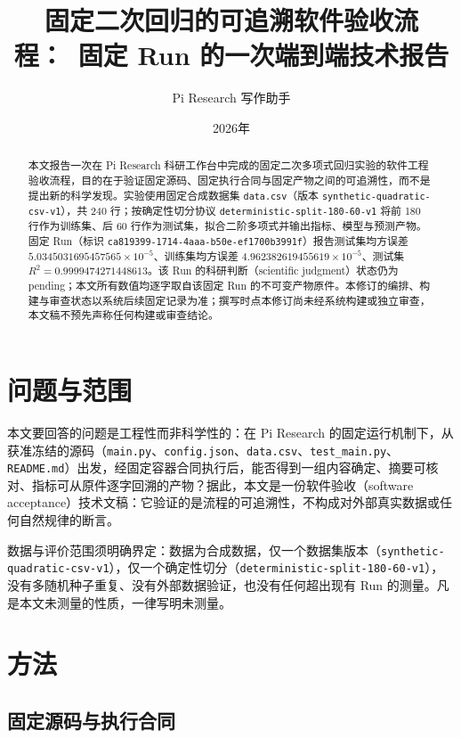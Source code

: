 \documentclass[a4paper,11pt]{article}
\begin{document}
\title{固定二次回归的可追溯软件验收流程：\ 固定 Run 的一次端到端技术报告}
\author{Pi Research 写作助手}
\date{2026年}
\maketitle

\begin{abstract}
本文报告一次在 Pi Research 科研工作台中完成的固定二次多项式回归实验的软件工程验收流程，目的在于验证固定源码、固定执行合同与固定产物之间的可追溯性，而不是提出新的科学发现。实验使用固定合成数据集 \texttt{data.csv}（版本 \texttt{synthetic-}\allowbreak\texttt{quadratic-csv-v1}），共 240 行；按确定性切分协议 \texttt{deterministic-split-180-60-v1} 将前 180 行作为训练集、后 60 行作为测试集，拟合二阶多项式并输出指标、模型与预测产物。固定 Run（标识 \texttt{ca819399-1714-4aaa-}\allowbreak\texttt{b50e-ef1700b3991f}）报告测试集均方误差 $5.0345031695457565\times10^{-5}$、训练集均方误差 $4.962382619455619\times10^{-5}$、测试集 $R^2=0.9999474271448613$。该 Run 的科研判断（scientific judgment）状态仍为 pending；本文所有数值均逐字取自该固定 Run 的不可变产物原件。本修订的编排、构建与审查状态以系统后续固定记录为准；撰写时点本修订尚未经系统构建或独立审查，本文稿不预先声称任何构建或审查结论。
\end{abstract}

\section{问题与范围}

本文要回答的问题是工程性而非科学性的：在 Pi Research 的固定运行机制下，从获准冻结的源码（\texttt{main.py}、\texttt{config.json}、\texttt{data.csv}、\texttt{test\_main.py}、\texttt{README.md}）出发，经固定容器合同执行后，能否得到一组内容确定、摘要可核对、指标可从原件逐字回溯的产物？据此，本文是一份软件验收（software acceptance）技术文稿：它验证的是流程的可追溯性，不构成对外部真实数据或任何自然规律的断言。

数据与评价范围须明确界定：数据为合成数据，仅一个数据集版本（\texttt{synthetic-quadratic-csv-v1}），仅一个确定性切分（\texttt{deterministic-split-180-60-v1}），没有多随机种子重复、没有外部数据验证，也没有任何超出现有 Run 的测量。凡是本文未测量的性质，一律写明未测量。

\section{方法}

\subsection{固定源码与执行合同}
\end{document}
